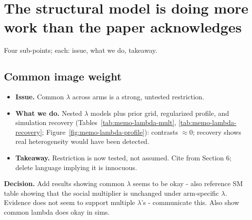 \documentclass[11pt]{article}
\providecommand{\StructuralRobustnessPath}{appendix/structural-robustness}
\providecommand{\StructuralRobustnessPath}{../appendix/structural-robustness}
\newenvironment{decision}
  {\par\medskip\noindent\begin{minipage}{\linewidth}\color{blue!50!black}\textbf{Decision.} }
  {\end{minipage}\par\medskip}
\begin{document}
\begin{table}[htbp]
  \centering
  \small
  \caption{Multipliers with asymmetric classification, tighter reporting priors
    (\texttt{sections/asymmetric-reporting-priors.tex})}
  \label{tab:memo-asym}
\end{table}

\begin{table}[htbp]
  \centering
  \scriptsize
  \caption{Paired No Signal $-$ Any Signal contrast across reporting models}
  \label{tab:memo-asym-contrast}
  {\setlength{\tabcolsep}{4pt}%
  }
\end{table}

\clearpage
\section{The structural model is doing more work than the paper acknowledges}
\label{sec:memo-structural}

Four sub-points; each: issue, what we do, takeaway.

\subsection{Common image weight}
\begin{itemize}[nosep]
  \item \textbf{Issue.} Common $\lambda$ across arms is a strong, untested restriction.
  \item \textbf{What we do.} Nested $\lambda$ models plus prior grid, regularized
    profile, and simulation recovery (Tables~\ref{tab:memo-lambda-mult},
    \ref{tab:memo-lambda-recovery}; Figure~\ref{fig:memo-lambda-profile}): contrasts
    $\approx 0$; recovery shows real heterogeneity would have been detected.
  \item \textbf{Takeaway.} Restriction is now tested, not assumed. Cite from Section 6;
    delete language implying it is innocuous.
\end{itemize}


\begin{decision}
  Add results showing common $\lambda$ seems to be okay - also reference SM table showing that the social multiplier is unchanged under arm-specific $\lambda$. Evidence 
  does not seem to support multiple $\lambda$'s - communicate this. Also show common lambda does okay in sims.
\end{decision}
\end{document}
